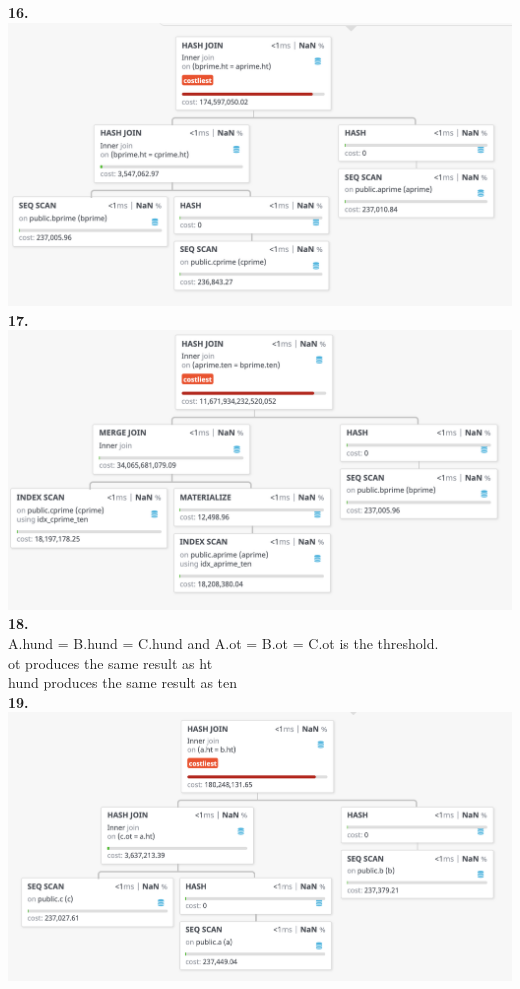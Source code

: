 \documentclass[12pt, letterpaper, fleqn]{article}
\begin{document}
  \textbf{16.}\\
  \includegraphics[scale=0.5]{query_pics/16.png} \\

  \textbf{17.}\\
  \includegraphics[scale=0.5]{query_pics/17.png} \\

  \textbf{18.} \\
  A.hund = B.hund = C.hund and A.ot = B.ot = C.ot is the threshold. \\
  ot produces the same result as ht \\
  hund produces the same result as ten \\

  \textbf{19.}\\
  \includegraphics[scale=0.5]{query_pics/19.png} \\
  
\end{document}

